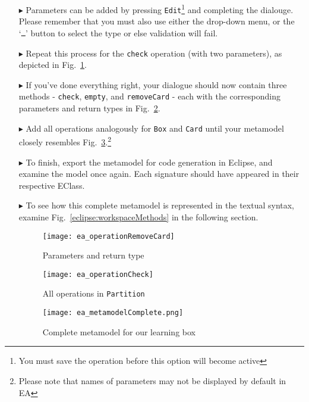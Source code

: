 \begin{enumerate}
\item[$\blacktriangleright$] Parameters can be added by pressing \texttt{Edit}\footnote{You must save the operation before this option will become active} and
completing the dialouge. Please remember that you must also use either the drop-down menu, or the `\texttt{\ldots}' button to select the type or else validation
will fail.

\item[$\blacktriangleright$] Repeat this process for the \texttt{check} operation (with two parameters), as depicted in Fig.~\ref{ea:operation_parameters}. 

\item[$\blacktriangleright$] If you've done everything right, your dialogue should now contain three methods - \texttt{check}, \texttt{empty}, and
\texttt{removeCard} - each with the corresponding parameters and return types in Fig.~\ref{ea:operation_partition}.


\item[$\blacktriangleright$] Add all operations analogously for \texttt{Box} and \texttt{Card} until your metamodel closely resembles
Fig.~\ref{ea:metamodel_complete}.\footnote{Please note that names of parameters may not be displayed by default in EA}

\item[$\blacktriangleright$] To finish, export the metamodel for code generation in Eclipse, and examine the model once again. Each signature should have
appeared in their respective EClass.

\item[$\blacktriangleright$] To see how this complete metamodel is represented in the textual syntax, examine Fig.~\ref{eclipse:workspaceMethods} in the
following section. 

\newpage

\vspace*{1cm}

\begin{figure}[htbp]
	\centering
  \texttt{[image: ea\_operationRemoveCard]}
	\caption{Parameters and return type}
	\label{ea:operation_parameters}
\end{figure}

\vspace{1cm}

\begin{figure}[h!]
	\centering
  \texttt{[image: ea\_operationCheck]}
	\caption{All operations in \texttt{Partition}}
	\label{ea:operation_partition}
\end{figure}

\newpage


\begin{figure}[htbp]
	\centering
  \texttt{[image: ea\_metamodelComplete.png]}
\caption[Complete metamodel for our learning box.]{Complete metamodel for our learning box}
	\label{ea:metamodel_complete}
\end{figure}
\FloatBarrier


\end{enumerate}

